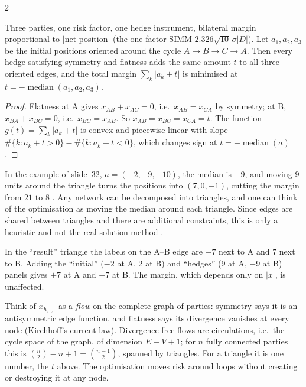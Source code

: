 \begin{paracol}{2}
\begin{proposition}\label{ch08:prop-median}
Three parties, one risk factor, one hedge instrument, bilateral margin proportional to $|$net position$|$ (the
one-factor SIMM $2.326\sqrt{10}\,\sigma|D|$). Let $a_1,a_2,a_3$ be the initial positions oriented around the cycle
$A\to B\to C\to A$. Then every hedge satisfying symmetry and flatness adds the same amount $t$ to all three oriented
edges, and the total margin $\sum_k|a_k+t|$ is minimised at $t=-\operatorname{median}(a_1,a_2,a_3)$.
\end{proposition}
\begin{proof}
Flatness at A gives $x_{AB}+x_{AC}=0$, i.e.\ $x_{AB}=x_{CA}$ by symmetry; at B, $x_{BA}+x_{BC}=0$, i.e.\
$x_{BC}=x_{AB}$. So $x_{AB}=x_{BC}=x_{CA}=t$. The function $g(t)=\sum_k|a_k+t|$ is convex and piecewise linear with
slope $\#\{k:a_k+t>0\}-\#\{k:a_k+t<0\}$, which changes sign at $t=-\operatorname{median}(a)$.
\end{proof}
In the example of slide~32, $a=(-2,-9,-10)$, the median is $-9$, and moving $9$ units around the triangle turns the
positions into $(7,0,-1)$, cutting the margin from $21$ to $8$ \ts{24}{10}{48:06}. Any network can be decomposed into
triangles, and one can think of the optimisation as moving the median around each triangle. Since edges are shared
between triangles and there are additional constraints, this is only a heuristic and not the real solution method
\ts{24}{10}{49:07}.

\begin{coursenote}
In the ``result'' triangle the labels on the A--B edge are $-7$ next to A and $7$ next to B. Adding the ``initial''
($-2$ at A, $2$ at B) and ``hedges'' ($9$ at A, $-9$ at B) panels gives $+7$ at A and $-7$ at B. The margin, which
depends only on $|x|$, is unaffected.
\end{coursenote}

\begin{intuition}
Think of $x_{h,\cdot,\cdot}$ as a \emph{flow} on the complete graph of parties: symmetry says it is an antisymmetric
edge function, and flatness says its divergence vanishes at every node (Kirchhoff's current law). Divergence-free
flows are circulations, i.e.\ the cycle space of the graph, of dimension $E-V+1$; for $n$ fully connected parties
this is $\binom n2-n+1=\binom{n-1}{2}$, spanned by triangles. For a triangle it is one number, the $t$ above. The
optimisation moves risk around loops without creating or destroying it at any node.
\end{intuition}


\end{paracol}
